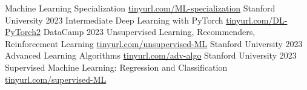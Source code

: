 
\def\mystr{3em}




\begin{cvhonors}

\cvhonor
   {Machine Learning Specialization}    %
   {
        \hfill
        \href{https://www.coursera.org/account/accomplishments/specialization/UED4Q5KFZZM8}{tinyurl.com/ML-specialization}
        \hspace{\mystr}
   }
   {Stanford University}      %
   {2023}    %
\cvhonor
   {Intermediate Deep Learning with PyTorch}    %
   {
        \hfill
        \href{https://www.datacamp.com/statement-of-accomplishment/course/432e350924c6a7474e5202570621ebc6e19155ed}{tinyurl.com/DL-PyTorch2}
        \hspace{\mystr}
   }
   {DataCamp}      %
   {2023}    %
\cvhonor
   {Unsupervised Learning, Recommenders, Reinforcement Learning}    %
   {
        \hfill
        \href{https://www.coursera.org/verify/BTRA97N45DMW}{tinyurl.com/unsupervised-ML}
        \hspace{\mystr}
   }
   {Stanford University}      %
   {2023}    %
\cvhonor
   {Advanced Learning Algorithms}    %
   {
        \hfill
        \href{https://coursera.org/verify/FKVKJHSWHHTA}{tinyurl.com/adv-algo}
        \hspace{\mystr}
   }
   {Stanford University}      %
   {2023}    %
\cvhonor
   {Supervised Machine Learning: Regression and Classification}    %
   {
        \hfill
        \href{https://coursera.org/verify/VATXKZ5XLU7W}{tinyurl.com/supervised-ML}
        \hspace{\mystr}
}
\end{cvhonors}
